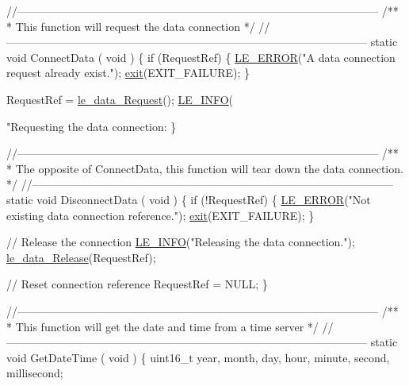\begin{DoxyCodeInclude}
{{{\textcolor{comment}{//--------------------------------------------------------------------------------------------------}\textcolor{comment}{}
\textcolor{comment}{/**}
\textcolor{comment}{ *  This function will request the data connection}
\textcolor{comment}{ */}
\textcolor{comment}{//--------------------------------------------------------------------------------------------------}
\textcolor{keyword}{static} \textcolor{keywordtype}{void} ConnectData
(
    \textcolor{keywordtype}{void}
)
\{
    \textcolor{keywordflow}{if} (RequestRef)
    \{
        \hyperlink{le__log_8h_a353590f91b3143a7ba3a416ae5a50c3d}{LE\_ERROR}(\textcolor{stringliteral}{"A data connection request already exist."});
        \hyperlink{app_stop_client_8c_a310220604a584e112ba8f7aa3dfe23f1}{exit}(EXIT\_FAILURE);
    \}

    RequestRef = \hyperlink{le__data__interface_8h_afb9db0acdd98620cb0cd303bee8a817c}{le\_data\_Request}();
    \hyperlink{le__log_8h_a23e6d206faa64f612045d688cdde5808}{LE\_INFO}(\textcolor{stringliteral}{"Requesting the data connection: %
\}

\textcolor{comment}{//--------------------------------------------------------------------------------------------------}\textcolor{comment}{}
\textcolor{comment}{/**}
\textcolor{comment}{ *  The opposite of ConnectData, this function will tear down the data connection.}
\textcolor{comment}{ */}
\textcolor{comment}{//--------------------------------------------------------------------------------------------------}
\textcolor{keyword}{static} \textcolor{keywordtype}{void} DisconnectData
(
    \textcolor{keywordtype}{void}
)
\{
    \textcolor{keywordflow}{if} (!RequestRef)
    \{
        \hyperlink{le__log_8h_a353590f91b3143a7ba3a416ae5a50c3d}{LE\_ERROR}(\textcolor{stringliteral}{"Not existing data connection reference."});
        \hyperlink{app_stop_client_8c_a310220604a584e112ba8f7aa3dfe23f1}{exit}(EXIT\_FAILURE);
    \}

    \textcolor{comment}{// Release the connection}
    \hyperlink{le__log_8h_a23e6d206faa64f612045d688cdde5808}{LE\_INFO}(\textcolor{stringliteral}{"Releasing the data connection."});
    \hyperlink{le__data__interface_8h_a1dc7cd8faed6b1ee02ea947cf02b8ee7}{le\_data\_Release}(RequestRef);

    \textcolor{comment}{// Reset connection reference}
    RequestRef = NULL;
\}

\textcolor{comment}{//--------------------------------------------------------------------------------------------------}\textcolor{comment}{}
\textcolor{comment}{/**}
\textcolor{comment}{ *  This function will get the date and time from a time server}
\textcolor{comment}{ */}
\textcolor{comment}{//--------------------------------------------------------------------------------------------------}
\textcolor{keyword}{static} \textcolor{keywordtype}{void} GetDateTime
(
    \textcolor{keywordtype}{void}
)
\{
    uint16\_t year, month, day, hour, minute, second, millisecond;

}}}}
\end{DoxyCodeInclude}
